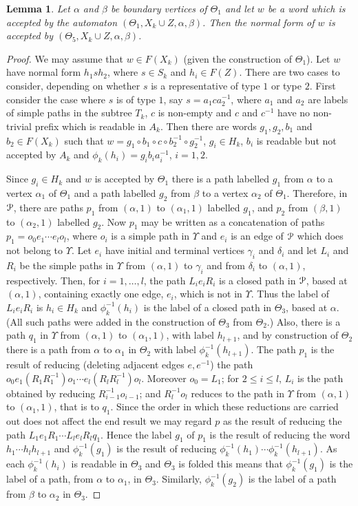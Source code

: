 \documentclass[a4paper,12pt]{article}
\renewcommand{\a}{\alpha }
\renewcommand{\b}{\beta }
\newcommand{\g}{\gamma }
\renewcommand{\d}{\delta }
\newcommand{\T}{\Theta }
\newcommand{\U}{\Upsilon }
\newcommand{\cP}{{\cal{P}}}
\newtheorem{lemma}[theorem]{Lemma}
\numberwithin{equation}{section}
\numberwithin{figure}{section}
\begin{document}
\begin{lemma}
Let $\a$ and $\b$ be boundary vertices of $\T_1$ and let $w$ be a word
 which is accepted by the automaton $(\T_1, X_k\cup Z, \a, \b)$. Then the
normal form of $w$ is accepted by $(\T_5, X_k\cup Z, \a, \b)$.
\end{lemma}
\begin{proof}
We may assume that $w\in F(X_k)$ (given the construction of $\T_1$).
Let $w$ have normal form $h_1s h_2$, where $s\in S_k$ and $h_i\in F(Z)$.
There are two cases to consider, depending on whether $s$ is a
representative of type $1$ or type $2$.
 First consider the case where $s$ is of type $1$, say
 $s= a_1 c a_2^{-1}$, where
$a_1$ and $a_2$ are labels
of simple paths in the subtree $T_k$, $c$ is non-empty
and $c$ and $c^{-1}$ have
no non-trivial prefix which is readable in $A_k$. Then there are words
$g_1, g_2, b_1$ and $b_2\in F(X_k)$ such that
$w=g_1\circ b_1\circ c \circ b_2^{-1}\circ g_2^{-1}$,
$g_i\in H_k$, $b_i$ is readable but not accepted by  $A_k$ and
$\phi_k(h_i)=g_ib_ia_i^{-1}$, $i=1,2$.

Since $g_i\in H_k$ and $w$ is accepted by $\T_1$ there is a path
labelled $g_1$ from $\a$ to a vertex $\a_1$ of $\T_1$ and a path
labelled $g_2$ from $\b$ to a vertex $\a_2$ of $\T_1$. Therefore, in $\cP$,
there are paths $p_1$ from $(\a,1)$ to $(\a_1,1)$ labelled $g_1$, and
$p_2$
from $(\b,1)$ to $(\a_2,1)$ labelled $g_2$.
Now $p_1$ may
be written as a concatenation of paths $p_1=o_0e_1\cdots e_l o_{l}$,
where $o_i$ is a simple path in $\U$ and $e_i$ is an edge of $\cP$ which does
not belong to $\U$.  Let $e_i$ have initial and terminal vertices
$\g_i$ and $\d_i$ and let $L_i$ and $R_i$ be the simple paths in $\U$ from
$(\a,1)$ to $\g_i$ and from $\d_i$ to $(\a,1)$, respectively.
Then, for $i=1,\ldots ,l$,
the path $L_i e_i R_i$ is a closed path in $\cP$, based
at $(\a,1)$, containing exactly one edge, $e_i$, which is not in $\U$.
Thus the label of  $L_i e_i R_i$ is $h_i\in H_k$ and $\phi_k^{-1}(h_i)$ is the
label of a closed path in $\T_3$, based at  $\a$. (All such paths
were added in the construction of $\T_3$ from $\T_2$.)
Also, there is a path $q_1$ in $\U$ from $(\a,1)$ to $(\a_1,1)$, with
label $h_{l+1}$, and by construction of $\T_2$ there is a path from $\a$ to
$\a_1$ in $\T_2$ with label $\phi_k^{-1}(h_{l+1})$.
The path
$p_1$ is the result of reducing (deleting adjacent edges $e,e^{-1}$) the path
$o_0 e_1 (R_1 R_1^{-1}) o_1 \cdots e_{l}(R_l R_l^{-1}) o_{l}$.
Moreover $o_0=L_1$; for $2\le i\le l$,
$L_i$ is the path obtained by reducing $R_{i-1}^{-1}o_{i-1}$; and
$R_{l}^{-1}o_{l}$ reduces to the path in $\U$ from
$(\a,1)$ to $(\a_1,1)$, that is to $q_1$.
Since the
order in which these reductions are carried out does not affect the end
result we may regard $p$ as the result of reducing the path
$L_1 e_1 R_1 \cdots L_l e_l R_l q_1$. Hence the label $g_1$
of $p_1$ is the result of
reducing the word $h_1\cdots h_l h_{l+1}$ and $\phi_k^{-1}(g_1)$ is the result of
reducing $\phi_k^{-1}(h_1) \cdots \phi_k^{-1}(h_{l+1})$. As each $\phi_k^{-1}(h_i)$ is readable
in $\T_3$ and $\T_3$ is folded this means  that $\phi_k^{-1}(g_1)$ is the
label of a path, from $\a$ to   $\a_1$, in $\T_3$. Similarly,
$\phi_k^{-1}(g_2)$
is the label of a path from $\b$ to $\a_2$ in $\T_3$.


\end{proof}
\end{document}
